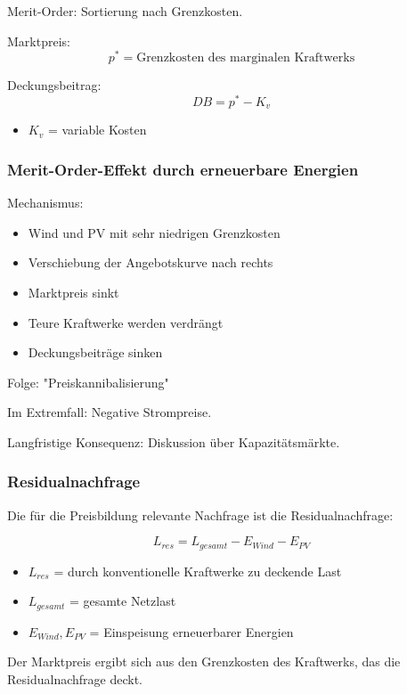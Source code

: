 Merit-Order:
Sortierung nach Grenzkosten.

Marktpreis:
\[
p^* = \text{Grenzkosten des marginalen Kraftwerks}
\]

Deckungsbeitrag:
\[
DB = p^* - K_v
\]

\begin{itemize}
\item $K_v$ = variable Kosten
\end{itemize}

\subsubsection{Merit-Order-Effekt durch erneuerbare Energien}

Mechanismus:

\begin{itemize}
\item Wind und PV mit sehr niedrigen Grenzkosten
\item Verschiebung der Angebotskurve nach rechts
\item Marktpreis sinkt
\item Teure Kraftwerke werden verdrängt
\item Deckungsbeiträge sinken
\end{itemize}

Folge:
"Preiskannibalisierung"

Im Extremfall:
Negative Strompreise.

Langfristige Konsequenz:
Diskussion über Kapazitätsmärkte.

\subsubsection{Residualnachfrage}

Die für die Preisbildung relevante Nachfrage ist die
Residualnachfrage:

\[
L_{res} = L_{gesamt} - E_{Wind} - E_{PV}
\]

\begin{itemize}
\item $L_{res}$ = durch konventionelle Kraftwerke zu deckende Last
\item $L_{gesamt}$ = gesamte Netzlast
\item $E_{Wind}, E_{PV}$ = Einspeisung erneuerbarer Energien
\end{itemize}

Der Marktpreis ergibt sich aus den Grenzkosten
des Kraftwerks, das die Residualnachfrage deckt.

